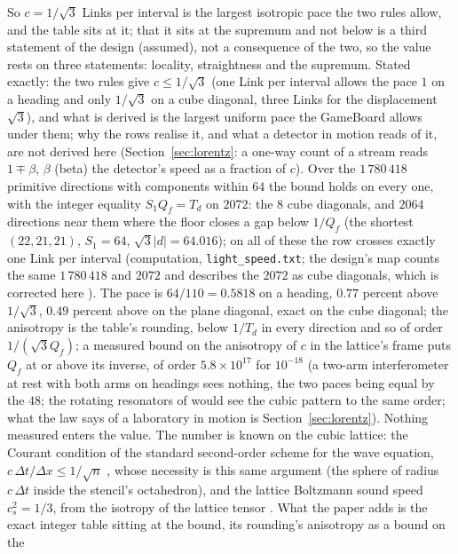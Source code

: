 \documentclass[11pt]{article}
\theoremstyle{definition}
\begin{document}
So $c = 1/\sqrt3$ Links per interval is the largest isotropic pace the two
rules allow, and the table sits at it; that it sits at the supremum and
not below is a third statement of the design (assumed), not a consequence
of the two, so the value rests on three statements: locality,
straightness and the supremum. Stated exactly: the two rules give
$c \le 1/\sqrt3$ (one Link per interval allows the pace $1$ on a heading
and only $1/\sqrt3$ on a cube diagonal, three Links for the displacement
$\sqrt3$), and what is derived is the largest uniform pace the GameBoard
allows under them; why the rows realise it, and what a detector in
motion reads of it, are not derived here (Section~\ref{sec:lorentz}:
a one-way count of a stream reads $1 \mp \beta$, $\beta$ (beta) the
detector's speed as a fraction of $c$). Over the $1\,780\,418$ primitive
directions with components within $64$ the bound holds on every one, with
the integer equality $S_1 Q_f = T_d$ on $2072$: the $8$ cube diagonals,
and $2064$ directions near them where the floor closes a gap below
$1/Q_f$ (the shortest $(22, 21, 21)$, $S_1 = 64$, $\sqrt3|d| = 64.016$);
on all of these the row crosses exactly one Link per interval
(computation, \texttt{light\_speed.txt}; the design's map counts the same
$1\,780\,418$ and $2072$ and describes the $2072$ as cube diagonals, which
is corrected here \cite{lightspeed}). The pace is $64/110 = 0.5818$ on a
heading, $0.77$ percent above $1/\sqrt3$, $0.49$ percent above on the
plane diagonal, exact on the cube diagonal; the anisotropy is the table's
rounding, below $1/T_d$ in every direction and so of order $1/(\sqrt3
Q_f)$; a measured bound on the anisotropy of $c$ in the lattice's frame
puts $Q_f$ at or above its inverse, of order $5.8 \times 10^{17}$ for
$10^{-18}$ \cite{nagel2015} (a two-arm interferometer at rest with both
arms on headings sees nothing, the two paces being equal by the $48$; the
rotating resonators of \cite{nagel2015} would see the cubic pattern to the
same order; what the law says of a laboratory in motion is
Section~\ref{sec:lorentz}). Nothing measured enters the value. The number
is known on the cubic lattice: the Courant condition of the standard
second-order scheme for the wave equation, $c\,\Delta t/\Delta x \le
1/\sqrt n$ \cite{cfl1928}, whose necessity is this same argument (the
sphere of radius $c\,\Delta t$ inside the stencil's octahedron), and the
lattice Boltzmann sound speed $c_s^2 = 1/3$, from the isotropy of the
lattice tensor \cite{qian1992}. What the paper adds is the exact integer
table sitting at the bound, its rounding's anisotropy as a bound on the
\end{document}

